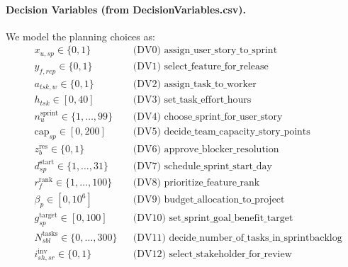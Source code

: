 \documentclass[a4paper,11pt]{article}
\begin{document}
\paragraph{Decision Variables (from DecisionVariables.csv).}
We model the planning choices as:
\begin{align*}
& x_{u,sp}\in\{0,1\} && \text{(DV0) assign\_user\_story\_to\_sprint} \\
& y_{f,rep}\in\{0,1\} && \text{(DV1) select\_feature\_for\_release} \\
& a_{tsk,w}\in\{0,1\} && \text{(DV2) assign\_task\_to\_worker} \\
& h_{tsk}\in[0,40] && \text{(DV3) set\_task\_effort\_hours} \\
& n^{\text{sprint}}_{u}\in\{1,\dots,99\} && \text{(DV4) choose\_sprint\_for\_user\_story} \\
& \text{cap}_{sp}\in[0,200] && \text{(DV5) decide\_team\_capacity\_story\_points} \\
& z^{\text{res}}_{b}\in\{0,1\} && \text{(DV6) approve\_blocker\_resolution} \\
& d^{\text{start}}_{sp}\in\{1,\dots,31\} && \text{(DV7) schedule\_sprint\_start\_day} \\
& r^{\text{rank}}_{f}\in\{1,\dots,100\} && \text{(DV8) prioritize\_feature\_rank} \\
& \beta_{p}\in[0,10^6] && \text{(DV9) budget\_allocation\_to\_project} \\
& g^{\text{target}}_{sp}\in[0,100] && \text{(DV10) set\_sprint\_goal\_benefit\_target} \\
& N^{\text{tasks}}_{sbl}\in\{0,\dots,300\} && \text{(DV11) decide\_number\_of\_tasks\_in\_sprintbacklog} \\
& i^{\text{inv}}_{sh,sr}\in\{0,1\} && \text{(DV12) select\_stakeholder\_for\_review}
\end{align*}
\end{document}
